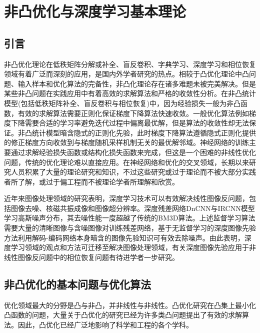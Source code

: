 \chapter{非凸优化与深度学习基本理论}
\label{chap:theory}

\section{引言}
非凸优化理论在低秩矩阵分解或补全、盲反卷积、字典学习、深度学习和相位恢复领域有着广泛而深刻的应用，是国内外学者研究的热点。相较于凸优化理论中凸问题、输入样本和优化算法的完备性，非凸化理论存在诸多难题未被完美解决。但是某些非凸问题在实践应用中有着高效的求解算法和严格的收敛性分析。在非凸统计模型(包括低秩矩阵补全、盲反卷积与相位恢复)中，因为经验损失一般为非凸函数，有效的求解算法需要正则化保证梯度下降算法快速收敛。一般优化算法例如梯度下降需要合适的学习率避免迭代过程中偏离最优解，但是算法的收敛性却无法保证。非凸统计模型暗含隐式的正则化先验，此时梯度下降算法遵循隐式正则化提供的修正梯度方向收敛到与梯度随机采样机制无关的最优解邻域。神经网络的训练主要通过求解经验损失函数或结构化损失函数来完成，但这是一个困难的非线性优化问题，传统的优化理论难以直接应用。在神经网络和优化的交叉领域，长期以来研究人员积累了大量的理论研究和知识，不过这些研究或过于理论而不被大部分实践者所了解，或过于偏工程而不被理论学者所理解和欣赏。

近年来图像处理领域的研究表明，深度学习技术可以有效解决线性图像反问题，包括图像去噪、核磁共振成像和图像超分辨率。深度残差网络DnCNN与IRCNN模型学习高斯噪声分布，其去噪性能一度超越了传统的BM3D算法。上述监督学习算法需要大量的清晰图像与含噪图像对训练残差网络，基于无监督学习的深度图像先验方法利用解码-编码网络本身暗含的图像先验知识可有效去除噪声。由此表明，深度学习领域的观点和方法可迁移至解决图像处理领域，有关深度图像先验应用于非线性图像反问题中的相位恢复问题有待进学者一步研究。

\section{非凸优化的基本问题与优化算法}
优化领域最大的分野是凸与非凸，并非线性与非线性。凸优化研究在凸集上最小化凸函数的问题，大量关于凸优化的研究已经为许多类凸问题提出了有效的求解算法。因此，凸优化已经广泛地影响了科学和工程的各个学科\supercite{Stephen3}。


